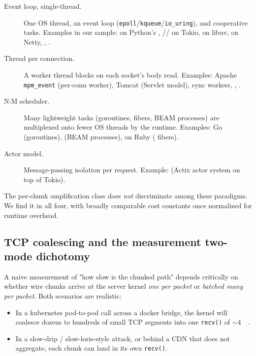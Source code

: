 \begin{description}
  \item[Event loop, single-thread.] One OS thread, an event loop
    (\texttt{epoll}/\texttt{kqueue}/\texttt{io\_uring}), and
    cooperative tasks. Examples in our sample:
     on Python's , //
    on Tokio,  on libuv,  on Netty,
    , .
  \item[Thread per connection.] A worker thread blocks on each
    socket's body read. Examples: Apache  \texttt{mpm\_event}
    (per-conn worker), Tomcat (Servlet model),  sync
    workers, , .
  \item[N:M scheduler.] Many lightweight tasks (goroutines, fibers,
    BEAM processes) are multiplexed onto fewer OS threads by the
    runtime. Examples: Go  (goroutines), 
    (BEAM processes),  on Ruby ( fibers).
  \item[Actor model.] Message-passing isolation per request.
    Example:  (Actix actor system on top of Tokio).
\end{description}

The per-chunk amplification class does \emph{not} discriminate among
these paradigms. We find it in all four, with broadly comparable
cost constants once normalized for runtime overhead.

\subsection{TCP coalescing and the measurement two-mode dichotomy}
\label{sec:bg-tcp}

A naive measurement of "how slow is the chunked path" depends
critically on whether wire chunks arrive at the server kernel
\emph{one per packet} or \emph{batched many per packet}. Both
scenarios are realistic:

\begin{itemize}
  \item In a kubernetes pod-to-pod call across a docker bridge, the
    kernel will coalesce dozens to hundreds of small TCP segments
    into one \texttt{recv()} of $\sim$\SI{4}{\kibi\byte}.
  \item In a slow-drip / slow-loris-style attack, or behind a CDN
    that does not aggregate, each chunk can land in its own
    \texttt{recv()}.
\end{itemize}

